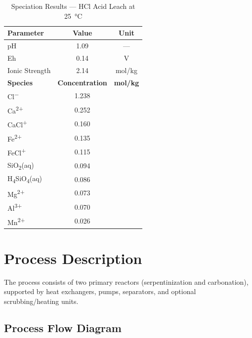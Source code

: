 \documentclass[11pt,a4paper]{article}
\begin{document}
\begin{table}[H]
\centering
\caption{Speciation Results --- HCl Acid Leach at \SI{25}{\celsius}}
\label{tab:speciation}
\begin{tabular}{lcc}
\toprule
\textbf{Parameter} & \textbf{Value} & \textbf{Unit} \\
\midrule
pH              & 1.09 & --- \\
Eh              & 0.14 & V \\
Ionic Strength  & 2.14 & mol/kg \\
\midrule
\textbf{Species}   & \textbf{Concentration} & \textbf{mol/kg} \\
\midrule
Cl\textsuperscript{$-$}         & 1.238 & \\
Ca\textsuperscript{2+}          & 0.252 & \\
CaCl\textsuperscript{+}         & 0.160 & \\
Fe\textsuperscript{2+}          & 0.135 & \\
FeCl\textsuperscript{+}         & 0.115 & \\
SiO\textsubscript{2}(aq)       & 0.094 & \\
H\textsubscript{4}SiO\textsubscript{4}(aq) & 0.086 & \\
Mg\textsuperscript{2+}          & 0.073 & \\
Al\textsuperscript{3+}          & 0.070 & \\
Mn\textsuperscript{2+}          & 0.026 & \\
\bottomrule
\end{tabular}
\end{table}

\section{Process Description}

The process consists of two primary reactors (serpentinization and carbonation), supported by heat exchangers, pumps, separators, and optional scrubbing/heating units.

\subsection{Process Flow Diagram}
\end{document}
